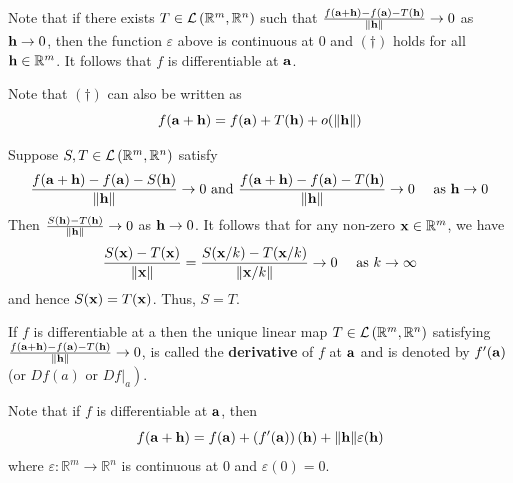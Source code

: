 \documentclass[a4paper]{article}
\begin{document}
Note that if there exists $T \in {\mathcal{L}}\left(\mathbb{R}^{m}, \mathbb{R}^{n}\right)$ such that $\frac{f({\bf a}+{\bf h})-f({\bf a})-T({\bf h})}{\|{\bf h}\|} \rightarrow 0$ as ${\bf h} \rightarrow 0$, then the function $\varepsilon$ above is continuous at 0 and $(\dagger)$ holds for all ${\bf h} \in \mathbb{R}^{m}$. It follows that $f$ is differentiable at ${\bf a}$.

Note that $(\dagger)$ can also be written as
$$
f({\bf a}+{\bf h})=f({\bf a})+T({\bf h})+o(\|{\bf h}\|)
$$

\begin{note}
    Suppose $S, T \in {\mathcal{L}}\left(\mathbb{R}^{m}, \mathbb{R}^{n}\right)$ satisfy
$$
\frac{f({\bf a}+{\bf h})-f({\bf a})-S({\bf h})}{\|{\bf h}\|} \rightarrow 0 \text { and } \frac{f({\bf a}+{\bf h})-f({\bf a})-T({\bf h})}{\|{\bf h}\|} \rightarrow 0 \quad \text { as } {\bf h} \rightarrow 0
$$
Then $\frac{S({\bf h})-T({\bf h})}{\|{\bf h}\|} \rightarrow 0$ as ${\bf h} \rightarrow 0$. It follows that for any non-zero ${\bf x} \in \mathbb{R}^{m}$, we have
$$
\frac{S({\bf x})-T({\bf x})}{\|{\bf x}\|}=\frac{S({\bf x} / k)-T({\bf x} / k)}{\|{\bf x} / k\|} \rightarrow 0 \quad \text { as } k \rightarrow \infty
$$
and hence $S({\bf x})=T({\bf x})$. Thus, $S=T$.
\end{note}

\begin{definition}
    If $f$ is differentiable at a then the unique linear map $T \in {\mathcal{L}}\left(\mathbb{R}^{m}, \mathbb{R}^{n}\right)$ satisfying $\frac{f({\bf a}+{\bf h})-f({\bf a})-T({\bf h})}{\|{\bf h}\|} \rightarrow 0$, is called the \textbf{derivative} of $f$ at ${\bf a}$ and is denoted by $f^{\prime}({\bf a})$ (or $D f(a)$ or $\left.\left.D f\right|_{a}\right)$.
\end{definition}

Note that if $f$ is differentiable at ${\bf a}$, then
$$
f({\bf a}+{\bf h})=f({\bf a})+\left(f^{\prime}({\bf a})\right)({\bf h})+\|{\bf h}\| \varepsilon({\bf h})
$$
where $\varepsilon: \mathbb{R}^{m} \rightarrow \mathbb{R}^{n}$ is continuous at 0 and $\varepsilon(0)=0$.
\end{document}
